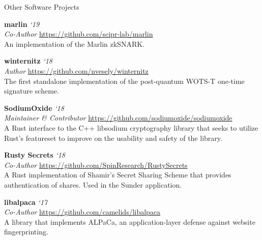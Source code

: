 \documentclass{cv}
\begin{document}
\begin{rSection}{Other Software Projects}

\textbf{marlin} \hfill \emph{`19} \\
\emph{Co-Author} \hfill \url{https://github.com/scipr-lab/marlin} \\
{\small An implementation of the Marlin zkSNARK.}

\textbf{winternitz} \hfill \emph{`18} \\
\emph{Author} \hfill \url{https://github.com/nvesely/winternitz} \\
{\small The first standalone implementation of the post-quantum WOTS-T one-time signature scheme.}

\textbf{SodiumOxide} \hfill \emph{`18} \\
\emph{Maintainer \& Contributor} \hfill \url{https://github.com/sodiumoxide/sodiumoxide} \\
{\small A Rust interface to the C++ libsodium cryptography library that seeks to utilize Rust's featureset to improve on the usability and safety of the library.}

\textbf{Rusty Secrets} \hfill \emph{`18} \\
\emph{Co-Author} \hfill \url{https://github.com/SpinResearch/RustySecrets} \\
{\small A Rust implementation of Shamir's Secret Sharing Scheme that provides authentication of shares. Used in the Sunder application.}

\textbf{libalpaca} \hfill \emph{`17} \\
\emph{Co-Author} \hfill \url{https://github.com/camelids/libalpaca}\\
{\small A library that implements ALPaCa, an application-layer defense against website fingerprinting.}

\end{rSection}


\end{document}
